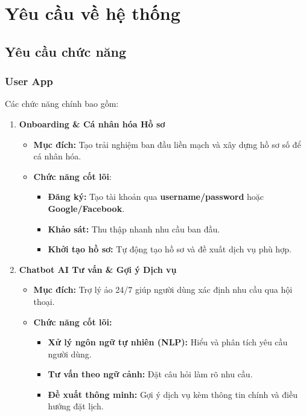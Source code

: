 \chapter{Yêu cầu về hệ thống}

\section{Yêu cầu chức năng}

\subsection{User App}
Các chức năng chính bao gồm:
\begin{enumerate}
    \item \textbf{Onboarding \& Cá nhân hóa Hồ sơ}
    \begin{itemize}
        \item \textbf{Mục đích:} Tạo trải nghiệm ban đầu liền mạch và xây dựng hồ sơ số để cá nhân hóa.
        \item \textbf{Chức năng cốt lõi}:
        \begin{itemize}
            \item \textbf{Đăng ký:} Tạo tài khoản qua \textbf{username/password} hoặc \textbf{Google/Facebook}.
            \item  \textbf{Khảo sát: } Thu thập nhanh nhu cầu ban đầu.
            \item \textbf{Khởi tạo hồ sơ: }Tự động tạo hồ sơ và đề xuất dịch vụ phù hợp.
        \end{itemize}
    \end{itemize}
    \item \textbf{Chatbot AI Tư vấn \& Gợi ý Dịch vụ}
    \begin{itemize}
        \item \textbf{Mục đích: }Trợ lý ảo 24/7 giúp người dùng xác định nhu cầu qua hội thoại.
        \item \textbf{Chức năng cốt lõi:}
        \begin{itemize}
            \item \textbf{Xử lý ngôn ngữ tự nhiên (NLP):} Hiểu và phân tích yêu cầu người dùng.
            \item \textbf{Tư vấn theo ngữ cảnh:} Đặt câu hỏi làm rõ nhu cầu.
            \item  \textbf{Đề xuất thông minh: }Gợi ý dịch vụ kèm thông tin chính và điều hướng đặt lịch.
        \end{itemize}
    \end{itemize}

\end{enumerate}
